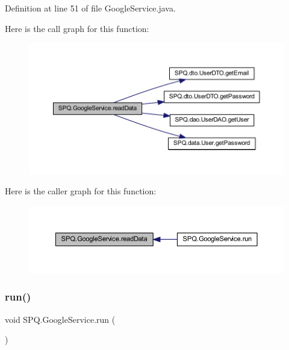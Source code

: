 Definition at line 51 of file Google\+Service.\+java.

Here is the call graph for this function\+:\nopagebreak
\begin{figure}[H]
\begin{center}
\leavevmode
\includegraphics[width=350pt]{class_s_p_q_1_1_google_service_a94e224618cc0433776bcb49bff80067f_cgraph}
\end{center}
\end{figure}
Here is the caller graph for this function\+:\nopagebreak
\begin{figure}[H]
\begin{center}
\leavevmode
\includegraphics[width=350pt]{class_s_p_q_1_1_google_service_a94e224618cc0433776bcb49bff80067f_icgraph}
\end{center}
\end{figure}
\mbox{\label{class_s_p_q_1_1_google_service_aecd41a7e761dc392fc96e096547dc504}} 
\subsubsection{\texorpdfstring{run()}{run()}}
{\footnotesize\ttfamily void S\+P\+Q.\+Google\+Service.\+run (\begin{DoxyParamCaption}{ }\end{DoxyParamCaption})}



